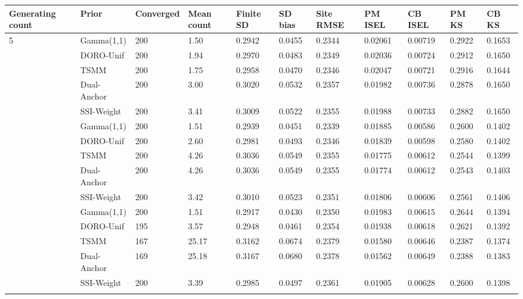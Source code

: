 \begin{longtable}{lllllllllll}
\toprule
Generating count & Prior & Converged & Mean count & Finite SD & SD bias & Site RMSE & PM ISEL & CB ISEL & PM KS & CB KS \\
\midrule\endhead
5 & Gamma(1,1) & 200 & 1.50 & 0.2942 & 0.0455 & 0.2344 & 0.02061 & 0.00719 & 0.2922 & 0.1653 \\ \addlinespace[3pt]
5 & DORO-Unif & 200 & 1.94 & 0.2970 & 0.0483 & 0.2349 & 0.02036 & 0.00724 & 0.2912 & 0.1650 \\ \addlinespace[3pt]
5 & TSMM & 200 & 1.75 & 0.2958 & 0.0470 & 0.2346 & 0.02047 & 0.00721 & 0.2916 & 0.1644 \\ \addlinespace[3pt]
5 & Dual-Anchor & 200 & 3.00 & 0.3020 & 0.0532 & 0.2357 & 0.01982 & 0.00736 & 0.2878 & 0.1650 \\ \addlinespace[3pt]
5 & SSI-Weight & 200 & 3.41 & 0.3009 & 0.0522 & 0.2355 & 0.01988 & 0.00733 & 0.2882 & 0.1650 \\ \addlinespace[3pt]
10 & Gamma(1,1) & 200 & 1.51 & 0.2939 & 0.0451 & 0.2339 & 0.01885 & 0.00586 & 0.2600 & 0.1402 \\ \addlinespace[3pt]
10 & DORO-Unif & 200 & 2.60 & 0.2981 & 0.0493 & 0.2346 & 0.01839 & 0.00598 & 0.2580 & 0.1402 \\ \addlinespace[3pt]
10 & TSMM & 200 & 4.26 & 0.3036 & 0.0549 & 0.2355 & 0.01775 & 0.00612 & 0.2544 & 0.1399 \\ \addlinespace[3pt]
10 & Dual-Anchor & 200 & 4.26 & 0.3036 & 0.0549 & 0.2355 & 0.01774 & 0.00612 & 0.2543 & 0.1403 \\ \addlinespace[3pt]
10 & SSI-Weight & 200 & 3.42 & 0.3010 & 0.0523 & 0.2351 & 0.01806 & 0.00606 & 0.2561 & 0.1406 \\ \addlinespace[3pt]
30 & Gamma(1,1) & 200 & 1.51 & 0.2917 & 0.0430 & 0.2350 & 0.01983 & 0.00615 & 0.2644 & 0.1394 \\ \addlinespace[3pt]
30 & DORO-Unif & 195 & 3.57 & 0.2948 & 0.0461 & 0.2354 & 0.01938 & 0.00618 & 0.2621 & 0.1392 \\ \addlinespace[3pt]
30 & TSMM & 167 & 25.17 & 0.3162 & 0.0674 & 0.2379 & 0.01580 & 0.00646 & 0.2387 & 0.1374 \\ \addlinespace[3pt]
30 & Dual-Anchor & 169 & 25.18 & 0.3167 & 0.0680 & 0.2378 & 0.01562 & 0.00649 & 0.2388 & 0.1383 \\ \addlinespace[3pt]
30 & SSI-Weight & 200 & 3.39 & 0.2985 & 0.0497 & 0.2361 & 0.01905 & 0.00628 & 0.2600 & 0.1398 \\ \addlinespace[3pt]
\bottomrule\end{longtable}
